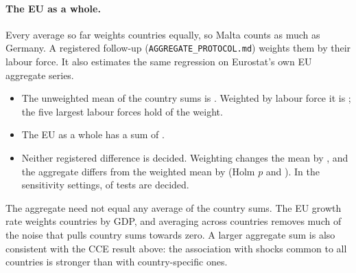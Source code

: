 \paragraph{The EU as a whole.} Every average so far weights countries equally, so Malta
counts as much as Germany. A registered follow-up (\texttt{AGGREGATE\_PROTOCOL.md}) weights them
by their labour force. It also estimates the same regression on Eurostat's own EU
aggregate series.
\begin{itemize}
  \item The unweighted mean of the country sums is  . Weighted by
    labour force it is  ; the five largest labour forces hold
     of the weight.
  \item The EU as a whole has a sum of  .
  \item Neither registered difference is decided. Weighting changes the mean by
     , and the aggregate differs from the weighted mean by
      (Holm $p$  and ). In the
    sensitivity settings,  of  tests are decided.
\end{itemize}
The aggregate need not equal any average of the country sums. The EU growth rate weights
countries by GDP, and averaging across countries removes much of the noise that pulls
country sums towards zero. A larger aggregate sum is also consistent with the CCE result
above: the association with shocks common to all countries is stronger than with
country-specific ones.

